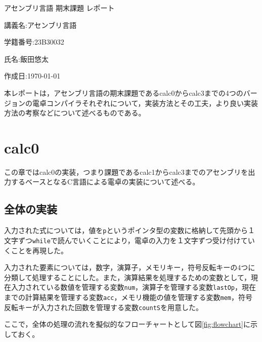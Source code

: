 \documentclass[a4paper]{jsarticle}
\newcommand{\var}[1]{\texttt{#1}}
\begin{document}
\begin{titlepage}
\begin{center}
\vspace*{150truept}
{\huge アセンブリ言語 期末課題 レポート}\par
\vspace{50truept}
{\large 講義名:アセンブリ言語}\par
\vspace{5truept}
{\large 学籍番号:23B30032}\par
\vspace{5truept}
{\large 氏名:飯田悠太}\par
\vspace{5truept}
{\large 作成日:\today}
\end{center}
\end{titlepage}
本レポートは，アセンブリ言語の期末課題であるcalc0からcalc3までの4つのバージョンの電卓コンパイラそれぞれについて，実装方法とその工夫，より良い実装方法の考察などについて述べるものである。
\section{calc0}
この章ではcalc0の実装，つまり課題であるcalc1からcalc3までのアセンブリを出力するベースとなるC言語による電卓の実装について述べる。
\subsection{全体の実装}
入力された式については，値を\var{p}というポインタ型の変数に格納して先頭から１文字ずつ\var{while}で読んでいくことにより，電卓の入力を１文字ずつ受け付けていくことを再現した。

入力された要素については，数字，演算子，メモリキー，符号反転キーの4つに分類して処理することにした。また，演算結果を処理するための変数として，現在入力されている数値を管理する変数\var{num}，演算子を管理する変数\var{lastOp}，現在までの計算結果を管理する変数\var{acc}，メモリ機能の値を管理する変数\var{mem}，符号反転キーが入力された回数を管理する変数\var{countS}を用意した。

ここで，全体の処理の流れを擬似的なフローチャートとして図\ref{fig:flowchart}に示しておく。
\end{document}
